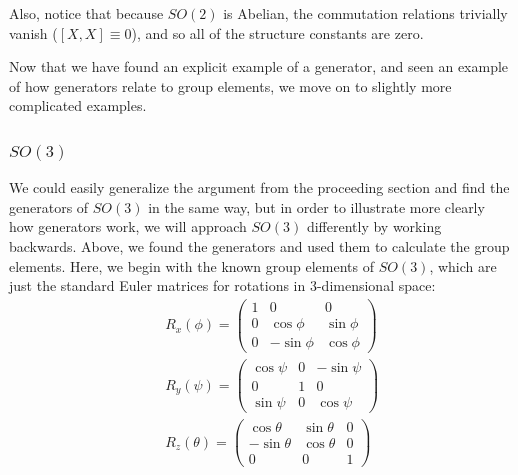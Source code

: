 \documentclass[12pt,epsf]{article}
\begin{document}
Also, notice that because $SO(2)$ is Abelian, the commutation relations
trivially vanish ($[X,X]\equiv 0$), and so all of the structure
constants are zero.  

Now that we have found an explicit example of a generator, and seen an
example of how generators relate to group elements, we move on to
slightly more complicated examples.  

\subsubsection{$SO(3)$}

We could easily generalize the argument from the proceeding section and
find the generators of $SO(3)$ in the same way, but in order to
illustrate more clearly how generators work, we will approach $SO(3)$
differently by working backwards.  Above, we found the generators and
used them to calculate the group elements.  Here, we begin with the
known group elements of $SO(3)$, which are just the standard Euler
matrices for rotations in 3-dimensional space:
\begin{eqnarray}
& & R_x(\phi) = 
\begin{pmatrix}
1 & 0 & 0 \\ 0 & \cos\phi & \sin\phi \\ 0 & -\sin\phi & \cos\phi
\end{pmatrix} \label{eq:rotx} \\
& & R_y(\psi) = 
\begin{pmatrix}
\cos \psi & 0 & -\sin\psi \\ 0 & 1 & 0 \\ \sin\psi & 0 & \cos\psi
\end{pmatrix} \label{eq:roty} \\
& & R_z(\theta) = 
\begin{pmatrix}
\cos \theta & \sin \theta & 0 \\-\sin\theta & \cos\theta & 0 \\ 0 & 0 & 1
\end{pmatrix} \label{eq:rotz}
\end{eqnarray}
\end{document}
